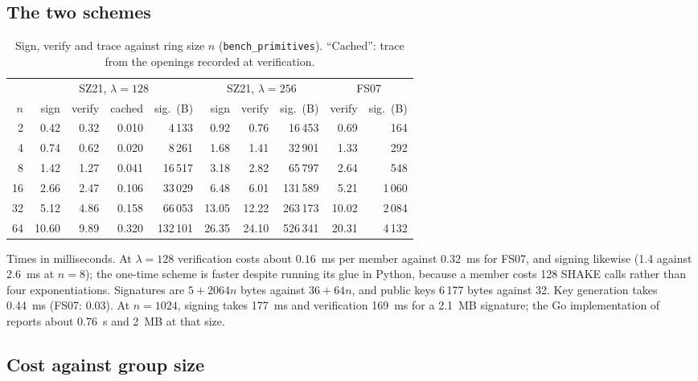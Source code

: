 \documentclass[11pt,a4paper]{article}
\theoremstyle{definition}
\begin{document}
\subsection{The two schemes}

\begin{table}[h]
\centering
\caption{Sign, verify and trace against ring size $n$
(\texttt{bench\_primitives}). ``Cached'': trace from the openings
recorded at verification.}
\label{tab:bench}
\small
\begin{tabular}{r rrrr rrr rr}
\toprule
& \multicolumn{4}{c}{SZ21, $\lambda = 128$} & \multicolumn{3}{c}{SZ21, $\lambda = 256$} & \multicolumn{2}{c}{FS07} \\
\cmidrule(lr){2-5}\cmidrule(lr){6-8}\cmidrule(lr){9-10}
$n$ & sign & verify & cached & sig.\ (B) & sign & verify & sig.\ (B) & verify & sig.\ (B) \\
\midrule
2   & 0.42  & 0.32 & 0.010 & 4\,133   & 0.92  & 0.76  & 16\,453  & 0.69  & 164 \\
4   & 0.74  & 0.62 & 0.020 & 8\,261   & 1.68  & 1.41  & 32\,901  & 1.33  & 292 \\
8   & 1.42  & 1.27 & 0.041 & 16\,517  & 3.18  & 2.82  & 65\,797  & 2.64  & 548 \\
16  & 2.66  & 2.47 & 0.106 & 33\,029  & 6.48  & 6.01  & 131\,589 & 5.21  & 1\,060 \\
32  & 5.12  & 4.86 & 0.158 & 66\,053  & 13.05 & 12.22 & 263\,173 & 10.02 & 2\,084 \\
64  & 10.60 & 9.89 & 0.320 & 132\,101 & 26.35 & 24.10 & 526\,341 & 20.31 & 4\,132 \\
\bottomrule
\end{tabular}
\end{table}

Times in milliseconds. At $\lambda = 128$ verification costs about
$0.16$~ms per member against $0.32$~ms for FS07, and signing likewise
(1.4 against 2.6~ms at $n = 8$); the one-time scheme is faster despite
running its glue in Python, because a member costs 128 SHAKE calls rather than four
exponentiations. Signatures are $5 + 2064n$ bytes against $36 + 64n$,
and public keys 6\,177 bytes against 32. Key generation takes 0.44~ms
(FS07: 0.03). At $n = 1024$, signing takes 177~ms and verification
169~ms for a 2.1~MB signature; the Go implementation of~\cite{SZ21}
reports about 0.76~s and 2~MB at that size.

\subsection{Cost against group size}
\end{document}
